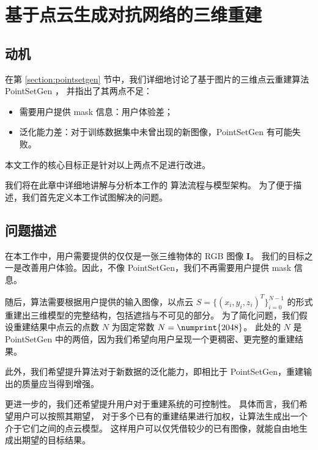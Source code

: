 \chapter{基于点云生成对抗网络的三维重建}
\label{cha:exp}
\section{动机}
在第 \ref{section:pointsetgen} 节中，我们详细地讨论了基于图片的三维点云重建算法 PointSetGen \cite{pointsetgen}，%
并指出了其两点不足：
\begin{itemize}
	\item 需要用户提供 mask 信息：用户体验差；
	\item 泛化能力差：对于训练数据集中未曾出现的新图像，PointSetGen 有可能失败。
\end{itemize}
本文工作的核心目标正是针对以上两点不足进行改进。

我们将在此章中详细地讲解与分析本工作的
算法流程与模型架构。
为了便于描述，我们首先定义本工作试图解决的问题。

\section{问题描述 \label{section:myquestion}}
在本工作中，用户需要提供的仅仅是一张三维物体的 RGB 图像 $\bm I$。%
我们的目标之一是改善用户体验。因此，不像 PointSetGen，我们不再需要用户提供 mask 信息。

随后，算法需要根据用户提供的输入图像，以点云
$S = \{(x_i, y_i, z_i)^T\}_{i=0}^{N - 1}$
的形式重建出三维模型的完整结构，包括遮挡与不可见的部分。
为了简化问题，我们假设重建结果中点云的点数 $N$ 为固定常数 $N = \numprint{2048}$。
此处的 $N$ 是 PointSetGen 中的两倍，因为我们希望向用户呈现一个更稠密、更完整的重建结果。

此外，我们希望提升算法对于新数据的泛化能力，即相比于 PointSetGen，重建输出的质量应当得到增强。

更进一步的，我们还希望提升用户对于重建系统的可控制性。
具体而言，我们希望用户可以按照其期望，
对于多个已有的重建结果进行加权，让算法生成出一个介于它们之间的点云模型。
这样用户可以仅凭借较少的已有图像，就能自由地生成出期望的目标结果。








